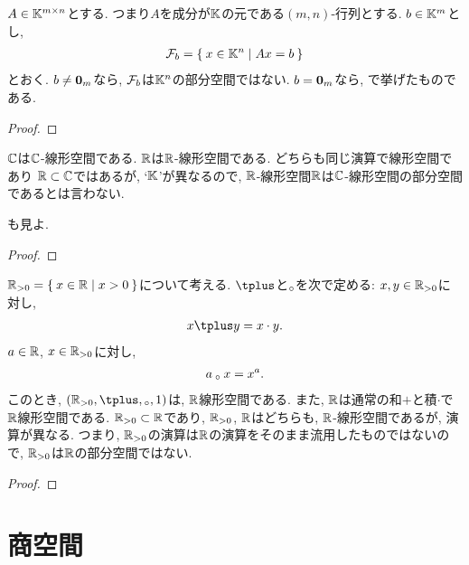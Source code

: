 \begin{example}
  \label{subsp:nonexample:fiber}
  $A\in \mathbb{K}^{m\times n}$とする.
  つまり$A$を成分が$\mathbb{K}$の元である$(m,n)$-行列とする.
  $b\in \mathbb{K}^m$とし,
  \begin{align*}
    \mathcal{F}_b=\Set{x\in \mathbb{K}^n|Ax=b}
  \end{align*}
  とおく.
  $b\neq \boldsymbol{0}_m$なら,
  $\mathcal{F}_b$は$\mathbb{K}^n$の部分空間ではない.
  $b= \boldsymbol{0}_m$なら,
  で挙げたものである.
\end{example}
\begin{proof}\end{proof}



\begin{example}
  \label{subsp:nonexample:cc}
  $\mathbb{C}$は$\mathbb{C}$-線形空間である.
  $\mathbb{R}$は$\mathbb{R}$-線形空間である.
  どちらも同じ演算で線形空間であり
  $\mathbb{R}\subset \mathbb{C}$ではあるが,
  `$\mathbb{K}$'が異なるので,
  $\mathbb{R}$-線形空間$\mathbb{R}$は$\mathbb{C}$-線形空間の部分空間であるとは言わない.

  も見よ.
\end{example}
\begin{proof}\end{proof}

\begin{example}
  $\mathbb{R}_{>0}=\Set{x\in\mathbb{R}|x>0}$について考える.
  $\pplus$と$\mathbin{{}_\circ}$を次で定める:
  $x,y\in\mathbb{R}_{>0}$に対し,
  \begin{align*}
    x\pplus y =x\cdot y.
  \end{align*}
  $a\in\mathbb{R}$, $x\in\mathbb{R}_{>0}$に対し,
  \begin{align*}
    a\mathbin{{}_\circ} x=x^a.
  \end{align*}
  このとき, $(\RR_{>0},\pplus,\aact,1)$は, $\mathbb{R}$線形空間である.
  また, $\mathbb{R}$は通常の和$+$と積$\cdot$で$\mathbb{R}$線形空間である.
  $\mathbb{R}_{>0}\subset \mathbb{R}$であり, $\mathbb{R}_{>0}$, $\mathbb{R}$はどちらも, $\mathbb{R}$-線形空間であるが, 演算が異なる.
  つまり, $\mathbb{R}_{>0}$の演算は$\mathbb{R}$の演算をそのまま流用したものではないので,
  $\mathbb{R}_{>0}$は$\mathbb{R}$の部分空間ではない.
\end{example}
\begin{proof}\end{proof}

\begin{quiz}
\end{quiz}

\chapter{商空間}
\begin{quiz}
\end{quiz}
